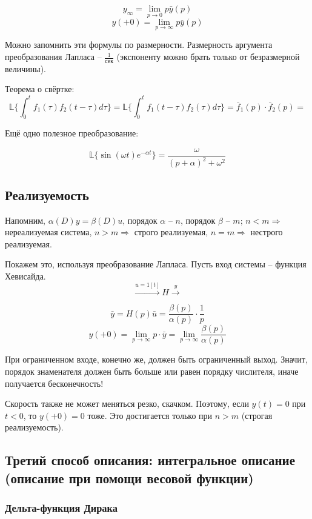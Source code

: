 \documentclass[main.tex]{subfiles}
\begin{document}
\[ y_\infty = \lim_{p \to 0} p \bar y(p) \]
\[ y(+0) = \lim_{p \to \infty} p \bar y(p) \]

Можно запомнить эти формулы по размерности.
Размерность аргумента преобразования Лапласа -- $ \frac{1}{\text{сек}} $ (экспоненту можно брать только от безразмерной величины).

Теорема о свёртке:
\[ \mathds{L}\{ \int_{0}^{t} f_1(\tau) f_2(t-\tau) d\tau  \} = \mathds{L}\{ \int_{0}^{t} f_1(t-\tau) f_2(\tau) d\tau \} = \bar f_1 (p) \cdot \bar f_2 (p) = \]

Ещё одно полезное преобразование:

\[ \mathds{L}\{ \sin (\omega t) e^{-\alpha t} \} = \frac{\omega}{(p + \alpha)^2 + \omega^2} \]

\subsection{Реализуемость}

Напомним, $ \alpha(D)y = \beta(D) u $, порядок $ \alpha $ -- $ n $, порядок $ \beta $ -- $ m $; $ n < m \Rightarrow $ нереализуемая система, $ n > m \Rightarrow $ строго реализуемая, $ n = m \Rightarrow $ нестрого реализуемая.

Покажем это, используя преобразование Лапласа.
Пусть вход системы -- функция Хевисайда.
\[ \xrightarrow{u = 1[t]}\boxed{H}\xrightarrow{y} \]

$$ \bar y = H(p) \bar u = \frac{\beta(p)}{\alpha(p)} \cdot \frac{1}{p} $$
\[ y(+0) = \lim_{p \to \infty} p \cdot \bar y = \lim_{p \to \infty} \frac{\beta(p)}{\alpha(p)} \]

При ограниченном входе, конечно же, должен быть ограниченный выход.
Значит, порядок знаменателя должен быть больше или равен порядку числителя, иначе получается бесконечность!

Скорость также не может меняться резко, скачком.
Поэтому, если $ y(t) = 0 $ при $ t < 0 $, то $ y(+0) = 0 $ тоже.
Это достигается только при $ n > m $ (строгая реализуемость).

\subsection{Третий способ описания: интегральное описание (описание при помощи весовой функции)}

\subsubsection{ Дельта-функция Дирака }
\end{document}
